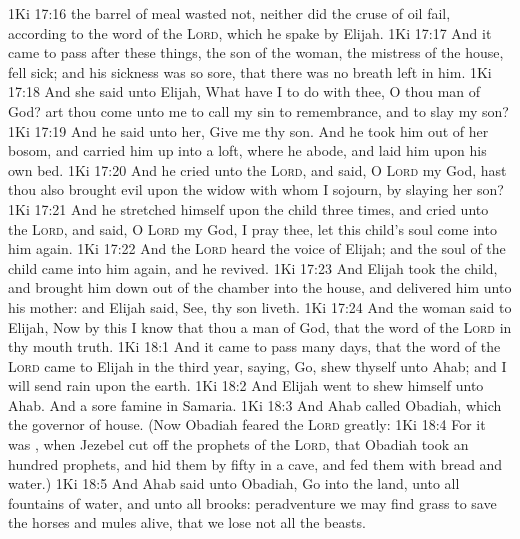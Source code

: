 \vs 1Ki 17:16  the barrel of meal wasted not, neither did the cruse of oil fail, according to the word of the \textsc{Lord}, which he spake by Elijah.
\vs 1Ki 17:17 And it came to pass after these things,  the son of the woman, the mistress of the house, fell sick; and his sickness was so sore, that there was no breath left in him.
\vs 1Ki 17:18 And she said unto Elijah, What have I to do with thee, O thou man of God? art thou come unto me to call my sin to remembrance, and to slay my son?
\vs 1Ki 17:19 And he said unto her, Give me thy son. And he took him out of her bosom, and carried him up into a loft, where he abode, and laid him upon his own bed.
\vs 1Ki 17:20 And he cried unto the \textsc{Lord}, and said, O \textsc{Lord} my God, hast thou also brought evil upon the widow with whom I sojourn, by slaying her son?
\vs 1Ki 17:21 And he stretched himself upon the child three times, and cried unto the \textsc{Lord}, and said, O \textsc{Lord} my God, I pray thee, let this child's soul come into him again.
\vs 1Ki 17:22 And the \textsc{Lord} heard the voice of Elijah; and the soul of the child came into him again, and he revived.
\vs 1Ki 17:23 And Elijah took the child, and brought him down out of the chamber into the house, and delivered him unto his mother: and Elijah said, See, thy son liveth.
\vs 1Ki 17:24 And the woman said to Elijah, Now by this I know that thou  a man of God,  that the word of the \textsc{Lord} in thy mouth  truth.
\vs 1Ki 18:1 And it came to pass  many days, that the word of the \textsc{Lord} came to Elijah in the third year, saying, Go, shew thyself unto Ahab; and I will send rain upon the earth.
\vs 1Ki 18:2 And Elijah went to shew himself unto Ahab. And  a sore famine in Samaria.
\vs 1Ki 18:3 And Ahab called Obadiah, which  the governor of  house. (Now Obadiah feared the \textsc{Lord} greatly:
\vs 1Ki 18:4 For it was , when Jezebel cut off the prophets of the \textsc{Lord}, that Obadiah took an hundred prophets, and hid them by fifty in a cave, and fed them with bread and water.)
\vs 1Ki 18:5 And Ahab said unto Obadiah, Go into the land, unto all fountains of water, and unto all brooks: peradventure we may find grass to save the horses and mules alive, that we lose not all the beasts.
